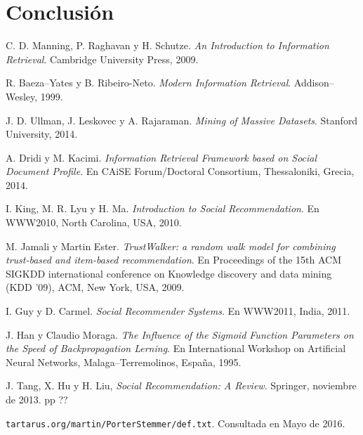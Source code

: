 \documentclass[11pt, spanish]{report}
\begin{document}
	\chapter{Conclusión}
		
	
		
	\begin{thebibliography}{56}
		
  			C. D. Manning, P. Raghavan y H. Schutze.
  			\textit{An Introduction to Information Retrieval}.
  			Cambridge University Press, 
  			2009.
  		
  			R. Baeza--Yates y B. Ribeiro-Neto.
  			\textit{Modern Information Retrieval}.
  			Addison--Wesley, 
  			1999.
  		
  			J. D. Ullman, J. Leskovec y A. Rajaraman.
  			\textit{Mining of Massive Datasets}.
  			Stanford University, 
  			2014.
  			
  			A. Dridi y M. Kacimi. 
  			\textit{Information Retrieval Framework based on Social Document Profile}. 
  			En CAiSE Forum/Doctoral Consortium, Thessaloniki, Grecia, 2014.
  		
  			I. King, M. R. Lyu y H. Ma. 
  			\textit{Introduction to Social Recommendation}. 
  			En WWW2010, North Carolina, USA, 2010.

  			M. Jamali y Martin Ester. 
  			\textit{TrustWalker: a random walk model for combining trust-based and item-based recommendation}. 
  			En Proceedings of the 15th ACM SIGKDD international conference on Knowledge discovery and data mining (KDD '09), ACM, New York, USA, 2009.
  			
  			I. Guy y D. Carmel. 
  			\textit{Social Recommender Systems}. 
  			En WWW2011, India, 2011.
  			
  			J. Han y Claudio Moraga. 
  			\textit{The Influence of the Sigmoid Function Parameters on the Speed of Backpropagation Lerning}. 
  			En International Workshop on Artificial Neural Networks, Malaga--Terremolinos, España, 1995.
  		
  			J. Tang, X. Hu y H. Liu, 
  			\textit{Social Recommendation: A Review}. 
  			Springer, 
  			noviembre de 2013. 
  			pp ??
  		
  			\texttt{tartarus.org/martin/PorterStemmer/def.txt}.
  			Consultada en Mayo de 2016.
  			
	\end{thebibliography}
		
	\appendix
\end{document}
